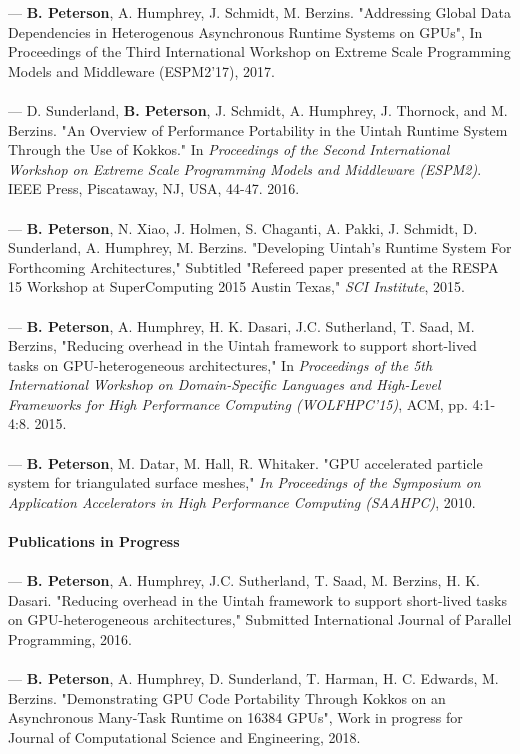 \documentclass[12pt]{article}
\begin{document}
\cite{espm2-brad}  --- \textbf{B. Peterson}, A. Humphrey, J. Schmidt, M. Berzins.  "Addressing Global Data Dependencies in Heterogenous Asynchronous Runtime Systems on GPUs", In {Proceedings of the Third International Workshop on Extreme Scale Programming Models and Middleware (ESPM2'17)}, 2017. \\
\\
\cite{espm2-16}  --- D. Sunderland, \textbf{B. Peterson}, J. Schmidt, A. Humphrey, J. Thornock, and M. Berzins. "An Overview of Performance Portability in the Uintah Runtime System Through the Use of Kokkos."  In \textit{Proceedings of the Second International Workshop on Extreme Scale Programming Models and Middleware (ESPM2)}. IEEE Press, Piscataway, NJ, USA, 44-47. 2016.\\
\\
\cite{respa-techreport-15} --- \textbf{B. Peterson}, N. Xiao, J. Holmen, S. Chaganti, A. Pakki, J. Schmidt, D. Sunderland, A. Humphrey, M. Berzins. "Developing Uintah's Runtime System For Forthcoming Architectures," Subtitled "Refereed paper presented at the RESPA 15 Workshop at SuperComputing 2015 Austin Texas," \textit{SCI Institute}, 2015.\\
\\
\cite{wolfhpc15} --- \textbf{B. Peterson}, A. Humphrey, H. K. Dasari, J.C. Sutherland, T. Saad, M. Berzins, "Reducing overhead in the Uintah framework to support short-lived tasks on GPU-heterogeneous architectures," In \textit{Proceedings of the 5th International Workshop on Domain-Specific Languages and High-Level Frameworks for High Performance Computing (WOLFHPC'15)}, ACM, pp. 4:1-4:8. 2015.\\
\\
\cite{saahpc-2010-brad} --- \textbf{B. Peterson}, M. Datar, M. Hall, R. Whitaker.  "GPU accelerated particle system for triangulated surface meshes," \textit{In Proceedings of the Symposium on Application Accelerators in High Performance Computing (SAAHPC)}, 2010.\\
\\
\textbf{Publications in Progress}\\
\\
\cite{ijpp16} --- \textbf{B. Peterson},  A. Humphrey, J.C. Sutherland, T. Saad, M. Berzins, H. K. Dasari. "Reducing overhead in the Uintah framework to support short-lived tasks on GPU-heterogeneous architectures," Submitted International Journal of Parallel Programming, 2016.\\
\\
\cite{jocs18} --- \textbf{B. Peterson}, A. Humphrey, D. Sunderland, T. Harman, H. C. Edwards, M. Berzins. "Demonstrating GPU Code Portability Through Kokkos on an Asynchronous Many-Task Runtime on 16384 GPUs",  Work in progress for Journal of Computational Science and Engineering, 2018.\\
\end{document}
